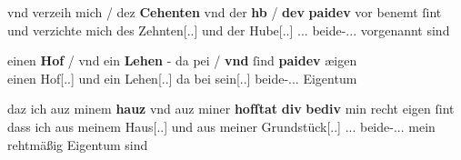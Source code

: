 \begin{exe}
\ex \label{ex:iclgr2}
\begin{xlist}
	\ex \label{ex:iclgr2_1}
		\gll vnd verzeih mich / \textelp{}  dez \textbf{Cehenten} vnd der \textbf{hb} 
				/ \textbf{dev} \textbf{paidev} {vor benemt} ſint \\
			und verzichte mich {} {} des Zehnten[\Gen.\Sg.\MascI] und der
				Hube[\Gen.\Sg.\FemI] {} \Rel.\Nom.\Pl.\NeutI{}
				beide-\Nom.\Pl.\NeutI.\St{} vorgenannt sind \\
			\begin{taggedline}{\parencites(Regensburg, 1299)[\pno~3261, 424.38--39]{cao4}}
			\trans {}
			\end{taggedline}

	\ex \label{ex:iclgr2_2}
		\gll einen \textbf{Hof} / vnd ein \textbf{Lehen} - da pei / \textbf{vnd} ſind
				\textbf{paidev} æigen \\
			einen Hof[\Acc.\Sg.\MascI] {} und ein Lehen[\Acc.\Sg.\NeutI] {} da
				bei {} \Rel{} sein[\Tpl\subM.\Ind.\Prs]
				beide-\Nom.\Pl.\NeutI.\St{} Eigentum \\
			\begin{taggedline}{\parencites(Steyr, 1294)[\pno~1923, 194.36--37]{cao3}}
			\trans {}
			\end{taggedline}

	\ex \label{ex:iclgr2_3}
		\gll daz ich auz minem \textbf{hauz} vnd auz miner \textbf{hofſtat}
				\textbf{div} \textbf{bediv} min recht eigen ſint \textelp{} \\
			dass ich aus meinem Haus[\Dat.\Sg.\NeutI] und aus meiner
				Grundstück[\Dat.\Sg.\FemI] \Rel.\Nom.\Pl.\NeutI{}
				beide-\Nom.\Pl.\NeutI.\St{} mein rehtmäßig Eigentum sind {} \\
			\begin{taggedline}{\parencites(Ulm und Kl.~Raitenhaslach, Kr.~Altötting, 1282)[\pno~1282, 526.37--38]{cao2}}
			\trans {}
			\end{taggedline}
	\end{xlist}
\end{exe}

